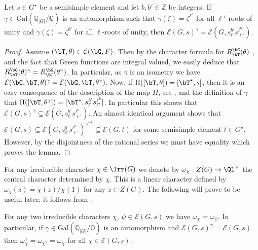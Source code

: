\documentclass[eqthmnum, nocolour]{jt-calcs}
\newcommand{\Q}{\mathbb{Q}}
\newcommand{\gal}{\mathrm{Gal}}
\begin{document}
\begin{lemma}\label{lem:galoisLseries}
Let $s\in G^{\star}$ be a semisimple element and let $b, b' \in \mathbb{Z}$ be integers. If $\gamma\in\gal(\Q_{|G|}/\Q)$ is an automorphism such that $\gamma(\zeta) = \zeta^{\ell^b}$ for all $\ell'$-roots of unity and $\gamma(\zeta) = \zeta^{b'}$ for all $\ell$-roots of unity, then $\mathcal{E}(G, s)^\gamma = \mathcal{E}(G, s_\ell^{b'}s_{\ell'}^{\ell^b})$.
\end{lemma}

\begin{proof}
Assume $(\bT,\theta) \in \mathcal{C}(\bG,F)$.  Then by the character formula for $R_{\bT}^{\bG}(\theta)$ \cite[7.2.8]{carter:1993:finite-groups-of-lie-type}, and the fact that Green functions are integral valued, we easily deduce that $R_{\bT}^{\bG}(\theta)^{\gamma} = R_{\bT}^{\bG}(\theta^{\gamma})$. In particular, as $\gamma$ is an isometry we have $\mathcal{E}(\bG,\bT,\theta)^{\gamma} = \mathcal{E}(\bG,\bT,\theta^{\gamma})$. Now, if $\Pi([\bT,\theta]) = [\bT^{\star},s]$, then it is an easy consequence of the description of the map $\Pi$, see \cite[\S13]{digne-michel:1991:representations-of-finite-groups-of-lie-type}, and the definition of $\gamma$ that $\Pi([\bT,\theta^{\gamma}]) = [\bT^{\star}, s_\ell^{b'}s_{\ell'}^{\ell^b}]$. In particular this shows that $\mathcal{E}(G,s)^{\gamma} \subseteq \mathcal{E}(G,s_\ell^{b'}s_{\ell'}^{\ell^b})$. An almost identical argument shows that $\mathcal{E}(G,s) \subseteq \mathcal{E}(G,s_\ell^{b'}s_{\ell'}^{\ell^b})^{\gamma^{-1}} \subseteq \mathcal{E}(G,t)$ for some semisimple element $t \in G^{\star}$. However, by the disjointness of the rational series we must have equality which proves the lemma.
\end{proof}

\begin{pa}
For any irreducible character $\chi \in \Irr(G)$ we denote by $\omega_{\chi} : Z(G) \to \Ql^{\times}$ the central character determined by $\chi$. This is a linear character defined by $\omega_{\chi}(z) = \chi(z)/\chi(1)$ for any $z \in Z(G)$. The following will prove to be useful later; it follows from \cite[11.1(d)]{bonnafe:2006:sln}.
\end{pa}

\begin{lem}\label{lem:central-char}
For any two irreducible characters $\chi$, $\psi \in \mathcal{E}(G,s)$ we have $\omega_{\chi} = \omega_{\psi}$. In particular, if $\gamma\in\gal(\Q_{|G|}/\Q)$ is an automorphism and $\mathcal{E}(G,s)^{\gamma} = \mathcal{E}(G,s)$ then $\omega_{\chi}^{\gamma} = \omega_{\chi^{\gamma}} = \omega_{\chi}$ for all $\chi \in \mathcal{E}(G,s)$.
\end{lem}
\end{document}
